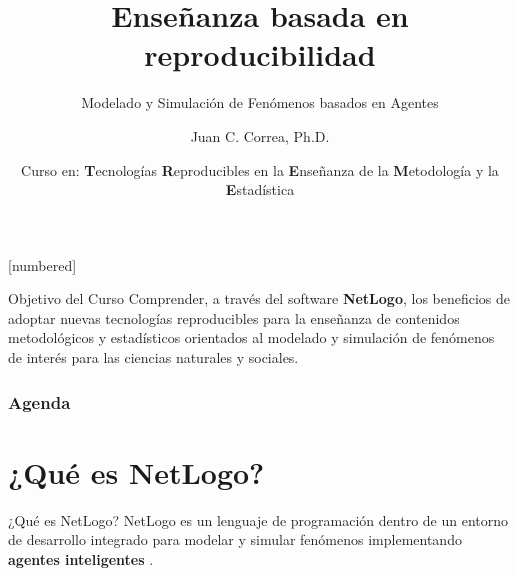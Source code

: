 \documentclass{beamer}
\begin{document}



\author[Juan C. Correa \textcolor{white}{(\url{https://correajc.com}})]{Juan C. Correa, Ph.D.}
\title[Enseñanza basada en reproducibilidad]{Enseñanza basada en reproducibilidad}
\subtitle{Modelado y Simulación de Fenómenos basados en Agentes}
[numbered]
\date[Bogotá, Junio-2021]{Curso en: \textbf{T}ecnologías \textbf{R}eproducibles en la \textbf{E}nseñanza de la \textbf{M}etodología y la \textbf{E}stadística}


\begin{frame}
	\titlepage
\end{frame}

\begin{frame}
\begin{block}{Objetivo del Curso}
\vspace{0.3cm}
Comprender, a través del software \textbf{NetLogo}, los beneficios de adoptar nuevas tecnologías reproducibles para la enseñanza de contenidos metodológicos y estadísticos orientados al modelado y simulación de fenómenos de interés para las ciencias naturales y sociales.
\end{block}
\end{frame}



\begin{frame}
\frametitle{Agenda} 
\tableofcontents
\end{frame}

\section{¿Qué es NetLogo?}
\begin{frame}{¿Qué es NetLogo?}
NetLogo es un lenguaje de programación dentro de un entorno de desarrollo integrado para modelar y simular fenómenos implementando \textbf{agentes inteligentes} \cite{Tisue2004}.
\end{frame}
\end{document}
